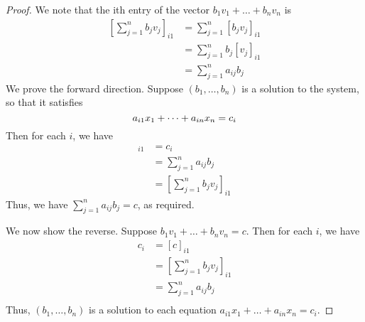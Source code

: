 \documentclass{article}
\begin{document}
\begin{proof}
  We note that the ith entry of the vector $b_1v_1 + \dots +b_nv_n$ is
  \begin{align*}
    \left[ \sum_{j=1}^n b_jv_j\right]_{i1} &= \sum_{j=1}^n [b_jv_j]_{i1} \tag{def. of vector add}\\
    &= \sum_{j=1}^n b_j[v_j]_{i1} \tag{def. of scalar mul.}\\
    &= \sum_{j=1}^n a_{ij}b_j
  \end{align*}
  We prove the forward direction. Suppose $(b_1, \ldots, b_n)$ is a solution to the system, so that it satisfies \[
    a_{i1}x_1 + \dots + a_{in}x_n = c_i\\
  \]
  Then for each $i$, we have
  \begin{align*}
    [c]_{i1} &= c_i\\
    &= \sum_{j=1}^n a_{ij}b_j\\
    &= \left[ \sum_{j=1}^n b_jv_j\right]_{i1}
  \end{align*}
  Thus, we have $\sum_{j=1}^n a_{ij}b_j = c$, as required.

  We now show the reverse.
  Suppose $b_1v_1 + \dots + b_nv_n = c$.
  Then for each $i$, we have
  \begin{align*}
    c_i &= [c]_{i1}\\
    &= \left[ \sum_{j=1}^n b_jv_j\right]_{i1} \tag{By assumption}\\
    &= \sum_{j=1}^n a_{ij}b_j\\
  \end{align*}
  Thus, $(b_1, \ldots, b_n)$ is a solution to each equation $a_{i1}x_1 + \dots + a_{in}x_n = c_i$.
\end{proof}
\end{document}
